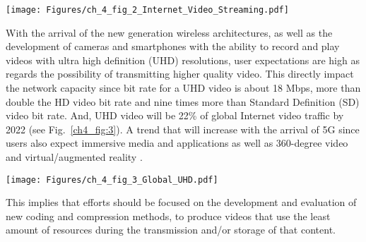 \begin{center}
\texttt{[image: Figures/ch\_4\_fig\_2\_Internet\_Video\_Streaming.pdf]}
\label{ch4_fig:2}       %
\end{center} 
 

With the arrival of the new generation wireless architectures, as well as the development of cameras and smartphones with the ability to record and play videos with ultra high definition (UHD) resolutions, user expectations are high as regards the possibility of transmitting higher quality video. This directly impact the network capacity since bit rate for a UHD video is about 18 Mbps, more than double the HD video bit rate and nine times more than Standard Definition (SD) video bit rate. And, UHD video will be 22\% of global Internet video traffic by 2022 (see Fig.~\ref{ch4_fig:3}). A trend that will increase with the arrival of 5G since users also expect immersive media and applications as well as 360-degree video and virtual/augmented reality \cite{mattos_2016}. 

\begin{center}
\texttt{[image: Figures/ch\_4\_fig\_3\_Global\_UHD.pdf]}
\label{ch4_fig:3}       %
\end{center}


This implies that efforts should be focused on the development and evaluation of new coding and compression methods, to produce videos that use the least amount of resources during the transmission and/or storage of that content.

